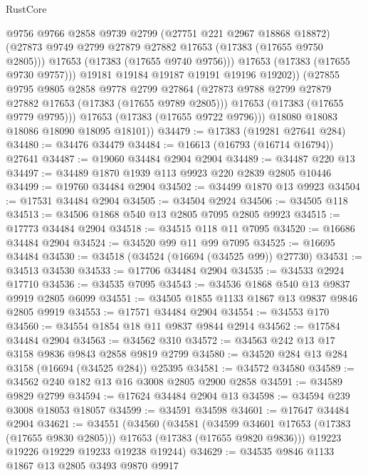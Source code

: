 \begin{lexlean}{RustCore}
\begin{coremodule}
                  @9756
                  @9766
                  @2858
                  @9739
                  @2799
                  (@27751 @221 @2967 @18868 @18872)
                  (@27873 @9749 @2799 @27879 @27882 @17653 (@17383 (@17655 @9750 @2805)))
                  @17653
                  (@17383 (@17655 @9740 @9756)))
                @17653
                (@17383 (@17655 @9730 @9757)))
              @19181
              @19184
              @19187
              @19191
              @19196
              @19202))
          (@27855
            @9795
            @9805
            @2858
            @9778
            @2799
            @27864
            (@27873 @9788 @2799 @27879 @27882 @17653 (@17383 (@17655 @9789 @2805)))
            @17653
            (@17383 (@17655 @9779 @9795)))
          @17653
          (@17383 (@17655 @9722 @9796)))
        @18080
        @18083
        @18086
        @18090
        @18095
        @18101))
@34479 := @17383 (@19281 @27641 @284)
@34480 := @34476 @34479
@34484 := @16613 (@16793 (@16714 @16794)) @27641
@34487 := @19060 @34484 @2904 @2904
@34489 := @34487 @220 @13
@34497 := @34489 @1870 @1939 @113 @9923 @220 @2839 @2805 @10446
@34499 := @19760 @34484 @2904
@34502 := @34499 @1870 @13 @9923
@34504 := @17531 @34484 @2904
@34505 := @34504 @2924
@34506 := @34505 @118
@34513 := @34506 @1868 @540 @13 @2805 @7095 @2805 @9923
@34515 := @17773 @34484 @2904
@34518 := @34515 @118 @11 @7095
@34520 := @16686 @34484 @2904
@34524 := @34520 @99 @11 @99 @7095
@34525 := @16695 @34484
@34530 := @34518 (@34524 (@16694 (@34525 @99)) @27730)
@34531 := @34513 @34530
@34533 := @17706 @34484 @2904
@34535 := @34533 @2924 @17710
@34536 := @34535 @7095
@34543 := @34536 @1868 @540 @13 @9837 @9919 @2805 @6099
@34551 := @34505 @1855 @1133 @1867 @13 @9837 @9846 @2805 @9919
@34553 := @17571 @34484 @2904
@34554 := @34553 @170
@34560 := @34554 @1854 @18 @11 @9837 @9844 @2914
@34562 := @17584 @34484 @2904
@34563 := @34562 @310
@34572 := @34563 @242 @13 @17 @3158 @9836 @9843 @2858 @9819 @2799
@34580 := @34520 @284 @13 @284 @3158 (@16694 (@34525 @284)) @25395
@34581 := @34572 @34580
@34589 := @34562 @240 @182 @13 @16 @3008 @2805 @2900 @2858
@34591 := @34589 @9829 @2799
@34594 := @17624 @34484 @2904 @13
@34598 := @34594 @239 @3008 @18053 @18057
@34599 := @34591 @34598
@34601 := @17647 @34484 @2904
@34621 := @34551
    (@34560
      (@34581
        (@34599 @34601 @17653 (@17383 (@17655 @9830 @2805)))
        @17653
        (@17383 (@17655 @9820 @9836)))
      @19223
      @19226
      @19229
      @19233
      @19238
      @19244)
@34629 := @34535 @9846 @1133 @1867 @13 @2805 @3493 @9870 @9917

\end{coremodule}
\end{lexlean}
